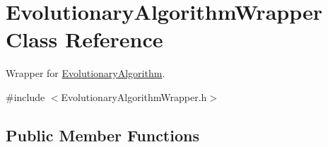 \hypertarget{classEvolutionaryAlgorithmWrapper}{}\section{Evolutionary\+Algorithm\+Wrapper Class Reference}
\label{classEvolutionaryAlgorithmWrapper}


Wrapper for \hyperlink{classEvolutionaryAlgorithm}{Evolutionary\+Algorithm}.  




{\ttfamily \#include $<$Evolutionary\+Algorithm\+Wrapper.\+h$>$}

\subsection*{Public Member Functions}
